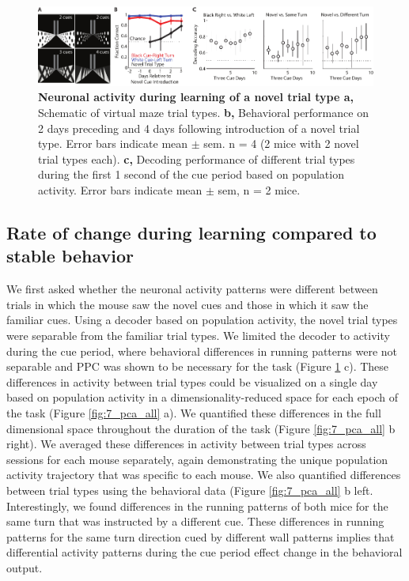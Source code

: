 \begin{figure}
\includegraphics[width=\textwidth]{figures/7_cues.pdf}
\caption[Neuronal activity during learning of a novel trial type]{\textbf{Neuronal activity during learning of a novel trial type a,} Schematic of virtual maze trial types. 
%
\textbf{b,} Behavioral performance on 2 days preceding and 4 days following introduction of a novel trial type. Error bars indicate mean $\pm$ sem. n = 4 (2 mice with 2 novel trial types each).
%
\textbf{c,} Decoding performance of different trial types during the first 1 second of the cue period based on population activity. Error bars indicate mean $\pm$ sem, n = 2 mice. 
\label{fig:7_cues}}
\end{figure}


\subsection{Rate of change during learning compared to stable behavior} \label{chap4:decoding}

We first asked whether the neuronal activity patterns were different between trials in which the mouse saw the novel cues and those in which it saw the familiar cues. Using a decoder based on population activity, the novel trial types were separable from the familiar trial types. We limited the decoder to activity during the cue period, where behavioral differences in running patterns were not separable and PPC was shown to be necessary for the task (Figure \ref{fig:7_cues} c). These differences in activity between trial types could be visualized on a single day based on population activity in a dimensionality-reduced space for each epoch of the task (Figure \ref{fig:7_pca_all} a). We quantified these differences in the full dimensional space throughout the duration of the task (Figure \ref{fig:7_pca_all} b right). We averaged these differences in activity between trial types across sessions for each mouse separately, again demonstrating the unique population activity trajectory that was specific to each mouse. We also quantified differences between trial types using the behavioral data (Figure \ref{fig:7_pca_all} b left. Interestingly, we found differences in the running patterns of both mice for the same turn that was instructed by a different cue. These differences in running patterns for the same turn direction cued by different wall patterns implies that differential activity patterns during the cue period effect change in the behavioral output.

